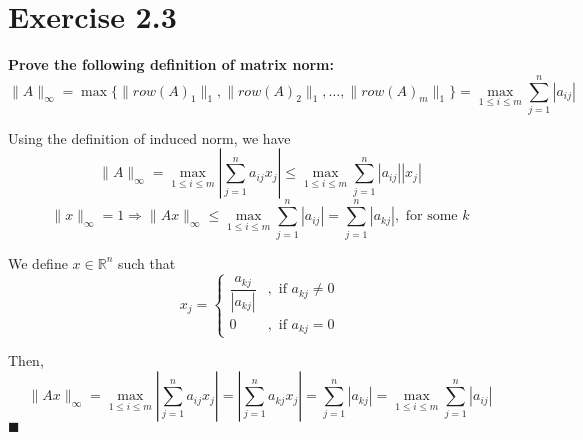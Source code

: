 \documentclass[11pt]{article}
\begin{document}
\section*{Exercise 2.3}
\textbf{\large Prove the following definition of matrix norm:}
\[\|A\|_\infty = \max\{\|row(A)_1\|_1, \|row(A)_2\|_1, \ldots, \|row(A)_m\|_1\} = \max_{1 \leq i \leq m} \sum_{j=1}^n |a_{ij}|\]

Using the definition of induced norm, we have
\[\|A\|_\infty = \max_{1 \leq i \leq m} \left|\sum_{j=1}^n a_{ij} x_j\right| \leq \max_{1 \leq i \leq m} \sum_{j=1}^n |a_{ij}||x_j|\]
\[\|x\|_\infty = 1 \Rightarrow \|Ax\|_\infty \leq \max_{1 \leq i \leq m} \sum_{j=1}^n |a_{ij}|  = \sum_{j=1}^n |a_{kj}|, \text{ for some } k\]

We define \(x \in \mathbb{R}^n\) such that
\[x_j = \begin{cases}
    \dfrac{a_{kj}}{|a_{kj}|} & , \text{ if } a_{kj} \neq 0 \\
    0 & , \text{ if } a_{kj} = 0
\end{cases}\]

Then,
\[\|Ax\|_\infty = \max_{1 \leq i \leq m} \left|\sum_{j=1}^n a_{ij} x_j\right| = \left|\sum_{j=1}^n a_{kj} x_j\right| = \sum_{j=1}^n |a_{kj}| = \max_{1 \leq i \leq m} \sum_{j=1}^n |a_{ij}|\]
\hfill \(\blacksquare\)
\end{document}
